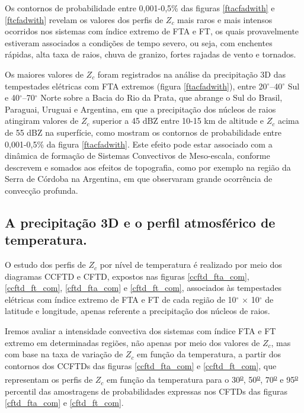 
Os contornos de probabilidade entre 0,001-0,5\% das figuras \ref{ftacfadwith} e \ref{ftcfadwith} revelam os valores dos perfis de $Z_c$ mais raros e mais intensos ocorridos nos sistemas com índice extremo de FTA e FT, os quais provavelmente estiveram associados a condições de tempo severo, ou seja, com enchentes rápidas, alta taxa de raios, chuva de granizo, fortes rajadas de vento e tornados. 

Os maiores valores de $Z_c$ foram registrados na análise da precipitação 3D das tempestades elétricas com FTA extremos (figura \ref{ftacfadwith}), entre 20$^{\circ}$--40$^{\circ}$ Sul e 40$^{\circ}$--70$^{\circ}$ Norte sobre a Bacia do Rio da Prata, que abrange o Sul do Brasil, Paraguai, Uruguai e Argentina, em que a precipitação dos núcleos de raios atingiram valores de $Z_c$ superior a 45 dBZ entre 10-15 km de altitude e $Z_c$ acima de 55 dBZ na superfície, como mostram os contornos de probabilidade entre 0,001-0,5\% da figura \ref{ftacfadwith}. Este efeito pode estar associado com a dinâmica de formação de Sistemas Convectivos de Meso-escala, conforme descrevem  e  somados aos efeitos de topografia, como por exemplo na região da Serra de Córdoba na Argentina, em que  observaram grande ocorrência de convecção profunda.


\subsection{A precipitação 3D e o perfil atmosférico de temperatura.}

O estudo dos perfis de $Z_c$ por nível de temperatura é realizado por meio dos diagramas CCFTD e CFTD, expostos nas figuras \ref{ccftd_fta_com}, \ref{ccftd_ft_com}, \ref{cftd_fta_com} e \ref{cftd_ft_com}, associados às tempestades elétricas com índice extremo de FTA e FT de cada região de 10$^{\circ}$ $\times$ 10$^{\circ}$ de latitude e longitude, apenas referente a precipitação dos núcleos de raios.

Iremos avaliar a intensidade convectiva dos sistemas com índice  FTA e FT extremo em determinadas regiões, não apenas por meio dos valores de $Z_c$, mas com base na taxa de variação de $Z_{c}$ em função da temperatura, a partir dos contornos dos CCFTDs das figuras \ref{ccftd_fta_com} e \ref{ccftd_ft_com}, que representam os perfis de $Z_c$ em função da temperatura para o 30\textsuperscript{\underline{o}}, 50\textsuperscript{\underline{o}}, 70\textsuperscript{\underline{o}} e 95\textsuperscript{\underline{o}} percentil das amostragens de probabilidades expressas nos CFTDs das figuras \ref{cftd_fta_com} e \ref{cftd_ft_com}.	

